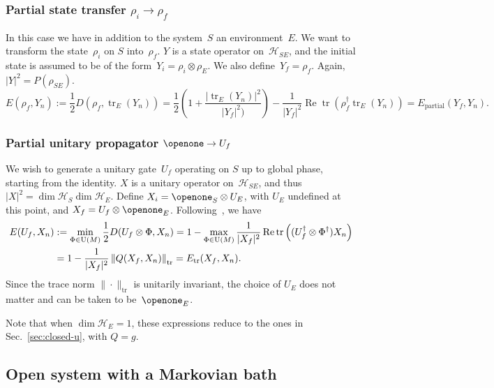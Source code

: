 \documentclass[aps, pra, a4paper, longbibliography]{revtex4}
\newcommand{\I}{\openone}
\newcommand{\be}{\begin{equation}}
\newcommand{\ee}{\end{equation}}
\newcommand{\hilb}[1]{\mathcal{#1}}
\DeclareMathOperator{\tr}{tr}
\DeclareMathOperator{\re}{Re}
\begin{document}
\subsubsection{Partial state transfer $\rho_i \to \rho_f$}

In this case we have in addition to the system~$S$ an environment~$E$.
We want to transform the state~$\rho_i$ on $S$ into~$\rho_f$.
$Y$ is a state operator on~$\hilb{H}_{SE}$, and
the initial state is assumed to be of the
form~$Y_i = \rho_i \otimes \rho_E$.
We also define~$Y_f = \rho_f$.
Again, $|Y|^2 = P(\rho_{SE})$.
\be
E(\rho_f, Y_n)
:= \frac{1}{2} D(\rho_f, \tr_E(Y_n))
= \frac{1}{2}\left(1 +\frac{|\tr_E(Y_n)|^2}{|Y_f|^2)}\right) -\frac{1}{|Y_f|^2} \re \tr(\rho_f^\dagger \tr_E(Y_n))
= E_\text{partial}(Y_f, Y_n).
\ee


\subsubsection{Partial unitary propagator $\I \to U_f$}

We wish to generate a unitary gate~$U_f$ operating on $S$ up to global
phase, starting from the identity.
$X$ is a unitary operator on~$\hilb{H}_{SE}$, and
thus $|X|^2 = \dim \hilb{H}_S \dim \hilb{H}_E$.
Define $X_i = \I_S \otimes U_E$, with $U_E$ undefined at this point,
and $X_f = U_f \otimes \I_E$.
Following~\cite{kosut_2006,floether_2012}, we have
\begin{align}
\notag
E(U_f, X_n)
&:= \min_{\Phi \in \text{U}(M)} \frac{1}{2} D(U_f \otimes \Phi, X_n)
= 1 -\max_{\Phi \in \text{U}(M)} \frac{1}{|X_f|^2} \re \tr\left((U_f^\dagger \otimes \Phi^\dagger) X_n\right)\\
&= 1 -\frac{1}{|X_f|^2} \left\|Q(X_f, X_n)\right\|_{\tr}
= E_\text{tr}(X_f, X_n).
\end{align}
Since the trace norm $\|\cdot\|_{\tr}$ is unitarily invariant, the
choice of $U_E$ does not matter and can be taken to be~$\I_E$.

Note that when $\dim \hilb{H}_E = 1$, these expressions reduce to the ones in Sec.~\ref{sec:closed-u},
with $Q = g$.





\subsection{Open system with a Markovian bath}
\end{document}
